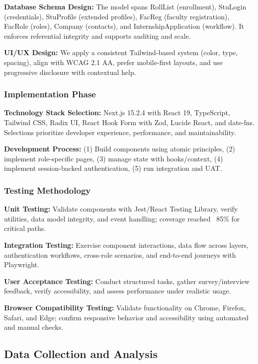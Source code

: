 \documentclass[conference]{IEEEtran}
\begin{document}
\textbf{Database Schema Design:} The model spans RollList (enrollment), StuLogin (credentials), StuProfile (extended profiles), FacReg (faculty registration), FacRole (roles), Company (contacts), and InternshipApplication (workflow). It enforces referential integrity and supports auditing and scale.

\textbf{UI/UX Design:} We apply a consistent Tailwind-based system (color, type, spacing), align with WCAG 2.1 AA, prefer mobile-first layouts, and use progressive disclosure with contextual help.

\subsubsection{Implementation Phase}
\textbf{Technology Stack Selection:} Next.js 15.2.4 with React 19, TypeScript, Tailwind CSS, Radix UI, React Hook Form with Zod, Lucide React, and date-fns. Selections prioritize developer experience, performance, and maintainability.

\textbf{Development Process:} (1) Build components using atomic principles, (2) implement role-specific pages, (3) manage state with hooks/context, (4) implement session-backed authentication, (5) run integration and UAT.

\subsubsection{Testing Methodology}
\textbf{Unit Testing:} Validate components with Jest/React Testing Library, verify utilities, data model integrity, and event handling; coverage reached ~85\% for critical paths.

\textbf{Integration Testing:} Exercise component interactions, data flow across layers, authentication workflows, cross-role scenarios, and end-to-end journeys with Playwright.

\textbf{User Acceptance Testing:} Conduct structured tasks, gather survey/interview feedback, verify accessibility, and assess performance under realistic usage.

\textbf{Browser Compatibility Testing:} Validate functionality on Chrome, Firefox, Safari, and Edge; confirm responsive behavior and accessibility using automated and manual checks.

\subsection{Data Collection and Analysis}
\end{document}
